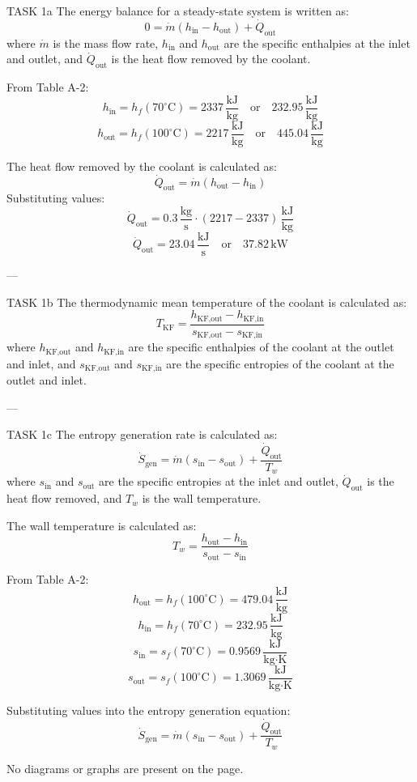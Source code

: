 TASK 1a  
The energy balance for a steady-state system is written as:  
\[
0 = \dot{m} (h_{\text{in}} - h_{\text{out}}) + \dot{Q}_{\text{out}}
\]  
where \( \dot{m} \) is the mass flow rate, \( h_{\text{in}} \) and \( h_{\text{out}} \) are the specific enthalpies at the inlet and outlet, and \( \dot{Q}_{\text{out}} \) is the heat flow removed by the coolant.  

From Table A-2:  
\[
h_{\text{in}} = h_f(70^\circ\text{C}) = 2337 \, \frac{\text{kJ}}{\text{kg}} \quad \text{or} \quad 232.95 \, \frac{\text{kJ}}{\text{kg}}
\]  
\[
h_{\text{out}} = h_f(100^\circ\text{C}) = 2217 \, \frac{\text{kJ}}{\text{kg}} \quad \text{or} \quad 445.04 \, \frac{\text{kJ}}{\text{kg}}
\]  

The heat flow removed by the coolant is calculated as:  
\[
\dot{Q}_{\text{out}} = \dot{m} (h_{\text{out}} - h_{\text{in}})
\]  
Substituting values:  
\[
\dot{Q}_{\text{out}} = 0.3 \, \frac{\text{kg}}{\text{s}} \cdot (2217 - 2337) \, \frac{\text{kJ}}{\text{kg}}
\]  
\[
\dot{Q}_{\text{out}} = 23.04 \, \frac{\text{kJ}}{\text{s}} \quad \text{or} \quad 37.82 \, \text{kW}
\]  

---

TASK 1b  
The thermodynamic mean temperature of the coolant is calculated as:  
\[
T_{\text{KF}} = \frac{h_{\text{KF,out}} - h_{\text{KF,in}}}{s_{\text{KF,out}} - s_{\text{KF,in}}}
\]  
where \( h_{\text{KF,out}} \) and \( h_{\text{KF,in}} \) are the specific enthalpies of the coolant at the outlet and inlet, and \( s_{\text{KF,out}} \) and \( s_{\text{KF,in}} \) are the specific entropies of the coolant at the outlet and inlet.

---

TASK 1c  
The entropy generation rate is calculated as:  
\[
\dot{S}_{\text{gen}} = \dot{m} (s_{\text{in}} - s_{\text{out}}) + \frac{\dot{Q}_{\text{out}}}{T_w}
\]  
where \( s_{\text{in}} \) and \( s_{\text{out}} \) are the specific entropies at the inlet and outlet, \( \dot{Q}_{\text{out}} \) is the heat flow removed, and \( T_w \) is the wall temperature.  

The wall temperature is calculated as:  
\[
T_w = \frac{h_{\text{out}} - h_{\text{in}}}{s_{\text{out}} - s_{\text{in}}}
\]  

From Table A-2:  
\[
h_{\text{out}} = h_f(100^\circ\text{C}) = 479.04 \, \frac{\text{kJ}}{\text{kg}}
\]  
\[
h_{\text{in}} = h_f(70^\circ\text{C}) = 232.95 \, \frac{\text{kJ}}{\text{kg}}
\]  
\[
s_{\text{in}} = s_f(70^\circ\text{C}) = 0.9569 \, \frac{\text{kJ}}{\text{kg·K}}
\]  
\[
s_{\text{out}} = s_f(100^\circ\text{C}) = 1.3069 \, \frac{\text{kJ}}{\text{kg·K}}
\]  

Substituting values into the entropy generation equation:  
\[
\dot{S}_{\text{gen}} = \dot{m} (s_{\text{in}} - s_{\text{out}}) + \frac{\dot{Q}_{\text{out}}}{T_w}
\]  

No diagrams or graphs are present on the page.